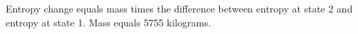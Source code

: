Entropy change equals mass times the difference between entropy at state 2 and entropy at state 1.  
Mass equals 5755 kilograms.